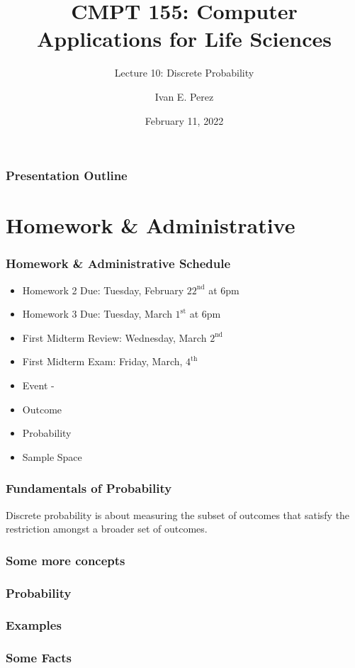 \documentclass[12pt]{beamer}
\title{CMPT 155: Computer Applications for Life Sciences}
\subtitle{Lecture 10: Discrete Probability}
\author{Ivan E. Perez}
\institute{}
\date{February 11, 2022}
\begin{document}
	
	\begin{frame}
		\titlepage
	\end{frame}
	
	\begin{frame}
		\frametitle{Presentation Outline}
		\tableofcontents
	\end{frame}
	\section{Homework \& Administrative}
	
	\begin{frame}
		\frametitle{Homework \& Administrative Schedule}
		\begin{itemize}
			\item Homework 2 Due: Tuesday, February $22^{\text{nd}}$ at 6pm
			\item Homework 3 Due: Tuesday, March $1^{\text{st}}$ at 6pm
			\item First Midterm Review:  Wednesday, March $2^{\text{nd}}$
			\item First Midterm Exam: Friday, March, $4^{\text{th}}$
			
		\end{itemize}
	\end{frame}
	\begin{frame}
		\begin{itemize}
			\item Event - 
			\item Outcome 
			\item Probability
			\item Sample Space 
		\end{itemize}	
	\end{frame}		
	\begin{frame}
		\frametitle{Fundamentals of Probability}
		Discrete probability is about measuring the subset of outcomes that satisfy the restriction amongst a broader set of outcomes.
		 
	\end{frame}
	\begin{frame}
		\frametitle{Some more concepts}
	\end{frame}
	\begin{frame}
		\frametitle{Probability}
	\end{frame}
	\begin{frame}
		\frametitle{Examples}
	\end{frame}
	\begin{frame}
		\frametitle{Some Facts}
	\end{frame}
\end{document}
